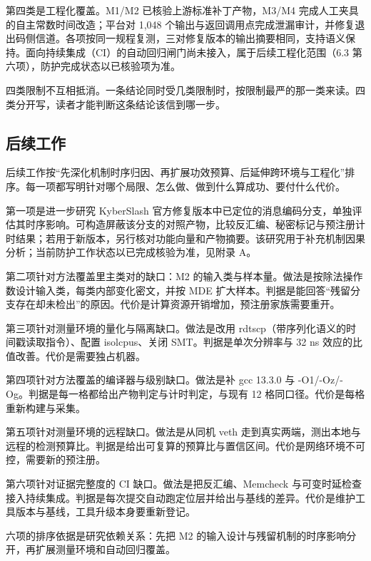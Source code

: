 第四类是工程化覆盖。M1/M2 已核验上游标准补丁产物，M3/M4 完成人工夹具的自主常数时间改造；平台对 1,048 个输出与返回调用点完成泄漏审计，并修复退出码侧信道。各项按同一规程复测，三对修复版本的输出摘要相同，支持语义保持。面向持续集成（CI）的自动回归闸门尚未接入，属于后续工程化范围（6.3 第六项），防护完成状态以已核验项为准。%

四类限制不互相抵消。一条结论同时受几类限制时，按限制最严的那一类来读。四类分开写，读者才能判断这条结论该信到哪一步。

\subsection{后续工作}

后续工作按“先深化机制时序归因、再扩展功效预算、后延伸跨环境与工程化”排序。每一项都写明针对哪个局限、怎么做、做到什么算成功、要付什么代价。

第一项是进一步研究 KyberSlash 官方修复版本中已定位的消息编码分支，单独评估其时序影响。可构造屏蔽该分支的对照产物，比较反汇编、秘密标记与预注册计时结果；若用于新版本，另行核对功能向量和产物摘要。该研究用于补充机制因果分析；当前防护工作状态以已完成核验为准，见附录 A。%

第二项针对方法覆盖里主类对的缺口：M2 的输入类与样本量。做法是按除法操作数设计输入类，每类内部变化密文，并按 MDE 扩大样本。判据是能回答“残留分支存在却未检出”的原因。代价是计算资源开销增加，预注册家族需要重开。%

第三项针对测量环境的量化与隔离缺口。做法是改用 rdtscp（带序列化语义的时间戳读取指令）、配置 isolcpus、关闭 SMT。判据是单次分辨率与 32 ns 效应的比值改善。代价是需要独占机器。%

第四项针对方法覆盖的编译器与级别缺口。做法是补 gcc 13.3.0 与 -O1/-Oz/-Og。判据是每一格都给出产物判定与计时判定，与现有 12 格同口径。代价是每格重新构建与采集。%

第五项针对测量环境的远程缺口。做法是从同机 veth 走到真实两端，测出本地与远程的检测预算比。判据是给出可复算的预算比与置信区间。代价是网络环境不可控，需要新的预注册。%

第六项针对证据完整度的 CI 缺口。做法是把反汇编、Memcheck 与可变时延检查接入持续集成。判据是每次提交自动跑定位层并给出与基线的差异。代价是维护工具版本与基线，工具升级本身要重新登记。%

六项的排序依据是研究依赖关系：先把 M2 的输入设计与残留机制的时序影响分开，再扩展测量环境和自动回归覆盖。
